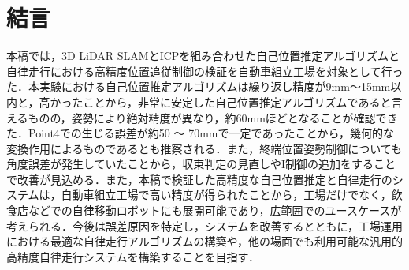\section{結言}
本稿では，3D LiDAR SLAMとICPを組み合わせた自己位置推定アルゴリズムと自律走行における高精度位置追従制御の検証を自動車組立工場を対象として行った．本実験における自己位置推定アルゴリズムは繰り返し精度が9mm〜15mm以内と，高かったことから，非常に安定した自己位置推定アルゴリズムであると言えるものの，姿勢により絶対精度が異なり，約60mmほどとなることが確認できた．Point4での生じる誤差が約50 〜 70mmで一定であったことから，幾何的な変換作用によるものであるとも推察される．また，終端位置姿勢制御についても角度誤差が発生していたことから，収束判定の見直しやI制御の追加をすることで改善が見込める．また，本稿で検証した高精度な自己位置推定と自律走行のシステムは，自動車組立工場で高い精度が得られたことから，工場だけでなく，飲食店などでの自律移動ロボットにも展開可能であり，広範囲でのユースケースが考えられる．今後は誤差原因を特定し，システムを改善するとともに，工場運用における最適な自律走行アルゴリズムの構築や，他の場面でも利用可能な汎用的高精度自律走行システムを構築することを目指す．
